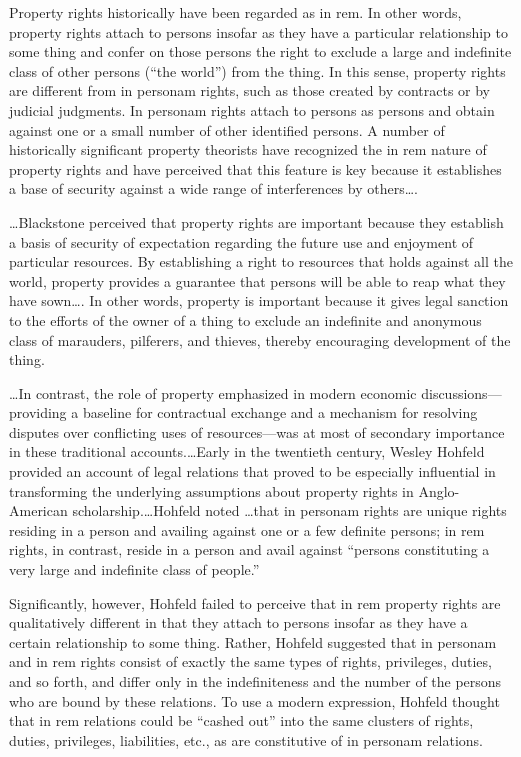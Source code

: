 Property rights historically have been regarded as in rem. In other words,
property rights attach to persons insofar as they have a particular
relationship to some thing and confer on those persons the right to exclude a
large and indefinite class of other persons (``the world'') from the thing. In
this sense, property rights are different from in personam rights, such as
those created by contracts or by judicial judgments. In personam rights attach
to persons as persons and obtain against one or a small number of other
identified persons. A number of historically significant property theorists
have recognized the in rem nature of property rights and have perceived that
this feature is key because it establishes a base of security against a wide
range of interferences by others\ldots.

\ldots Blackstone perceived that property rights are important because they
establish a basis of security of expectation regarding the future use and
enjoyment of particular resources. By establishing a right to resources that
holds against all the world, property provides a guarantee that persons will be
able to reap what they have sown\ldots. In other words, property is important
because it gives legal sanction to the efforts of the owner of a thing to
exclude an indefinite and anonymous class of marauders, pilferers, and thieves,
thereby encouraging development of the thing.

\ldots In contrast, the role of property emphasized in modern economic
discussions---providing a baseline for contractual exchange and a mechanism for
resolving disputes over conflicting uses of resources---was at most of
secondary importance in these traditional accounts.\ldots Early in the
twentieth century, Wesley Hohfeld provided an account of legal relations that
proved to be especially influential in transforming the underlying assumptions
about property rights in Anglo-American scholarship.\ldots Hohfeld noted
\ldots that in personam rights are unique rights residing in a person and
availing against one or a few definite persons; in rem rights, in contrast,
reside in a person and avail against ``persons constituting a very large and
indefinite class of people.'' 

Significantly, however, Hohfeld failed to perceive that in rem property rights
are qualitatively different in that they attach to persons insofar as they have
a certain relationship to some thing. Rather, Hohfeld suggested that in
personam and in rem rights consist of exactly the same types of rights,
privileges, duties, and so forth, and differ only in the indefiniteness and the
number of the persons who are bound by these relations. To use a modern
expression, Hohfeld thought that in rem relations could be ``cashed out'' into
the same clusters of rights, duties, privileges, liabilities, etc., as are
constitutive of in personam relations.

